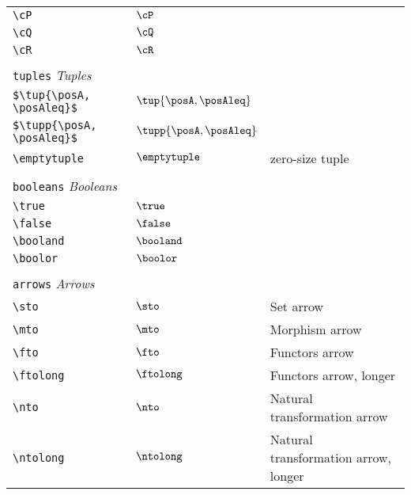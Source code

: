 \begin{longtable}{lll}
 {\color[rgb]{0.5,0.5,0.5}\texttt{\textbackslash cP}} & $\cP$ & \\ 
 {\color[rgb]{0.5,0.5,0.5}\texttt{\textbackslash cQ}} & $\cQ$ & \\ 
 {\color[rgb]{0.5,0.5,0.5}\texttt{\textbackslash cR}} & $\cR$ & \\ 
  &  & \\ 
 \multicolumn{3}{l}{{\color[rgb]{0.5,0.5,0.5}\texttt{tuples}} \emph{Tuples}}\\ 
 \hline
\hline
{\color[rgb]{0.5,0.5,0.5}\texttt{\$\textbackslash tup\{\textbackslash posA, \textbackslash posAleq\}\$}} & $\tup{\posA, \posAleq}$ & \\ 
 {\color[rgb]{0.5,0.5,0.5}\texttt{\$\textbackslash tupp\{\textbackslash posA, \textbackslash posAleq\}\$}} & $\tupp{\posA, \posAleq}$ & \\ 
 {\color[rgb]{0.5,0.5,0.5}\texttt{\textbackslash emptytuple}} & $\emptytuple$ &  zero-size tuple\\ 
  &  & \\ 
 \multicolumn{3}{l}{{\color[rgb]{0.5,0.5,0.5}\texttt{booleans}} \emph{Booleans}}\\ 
 \hline
\hline
{\color[rgb]{0.5,0.5,0.5}\texttt{\textbackslash true}} & $\true$ & \\ 
 {\color[rgb]{0.5,0.5,0.5}\texttt{\textbackslash false}} & $\false$ & \\ 
 {\color[rgb]{0.5,0.5,0.5}\texttt{\textbackslash booland}} & $\booland$ & \\ 
 {\color[rgb]{0.5,0.5,0.5}\texttt{\textbackslash boolor}} & $\boolor$ & \\ 
  &  & \\ 
 \multicolumn{3}{l}{{\color[rgb]{0.5,0.5,0.5}\texttt{arrows}} \emph{Arrows}}\\ 
 \hline
\hline
{\color[rgb]{0.5,0.5,0.5}\texttt{\textbackslash sto}} & $\sto$ &  Set arrow\\ 
 {\color[rgb]{0.5,0.5,0.5}\texttt{\textbackslash mto}} & $\mto$ &  Morphism arrow\\ 
 {\color[rgb]{0.5,0.5,0.5}\texttt{\textbackslash fto}} & $\fto$ &  Functors arrow\\ 
 {\color[rgb]{0.5,0.5,0.5}\texttt{\textbackslash ftolong}} & $\ftolong$ &  Functors arrow, longer\\ 
 {\color[rgb]{0.5,0.5,0.5}\texttt{\textbackslash nto}} & $\nto$ &  Natural transformation arrow\\ 
 {\color[rgb]{0.5,0.5,0.5}\texttt{\textbackslash ntolong}} & $\ntolong$ &  Natural transformation arrow, longer\\ 

\end{longtable}
